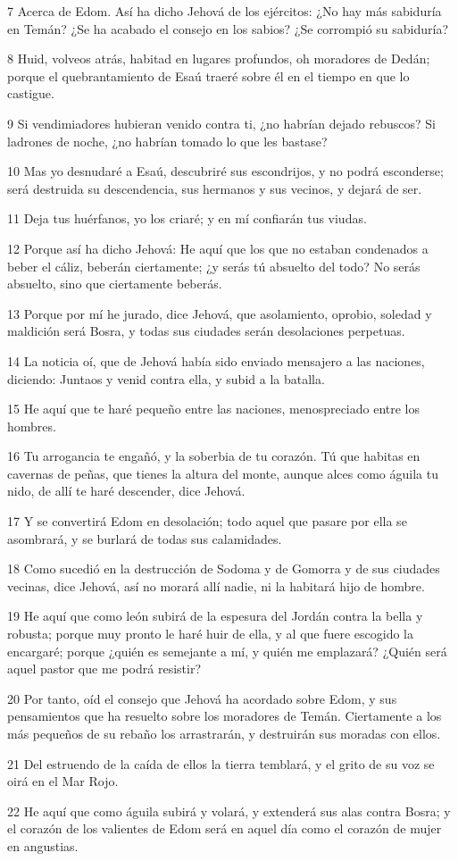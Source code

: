 \par 7 Acerca de Edom. Así ha dicho Jehová de los ejércitos: ¿No hay más sabiduría en Temán? ¿Se ha acabado el consejo en los sabios? ¿Se corrompió su sabiduría?
\par 8 Huid, volveos atrás, habitad en lugares profundos, oh moradores de Dedán; porque el quebrantamiento de Esaú traeré sobre él en el tiempo en que lo castigue.
\par 9 Si vendimiadores hubieran venido contra ti, ¿no habrían dejado rebuscos? Si ladrones de noche, ¿no habrían tomado lo que les bastase?
\par 10 Mas yo desnudaré a Esaú, descubriré sus escondrijos, y no podrá esconderse; será destruida su descendencia, sus hermanos y sus vecinos, y dejará de ser.
\par 11 Deja tus huérfanos, yo los criaré; y en mí confiarán tus viudas.
\par 12 Porque así ha dicho Jehová: He aquí que los que no estaban condenados a beber el cáliz, beberán ciertamente; ¿y serás tú absuelto del todo? No serás absuelto, sino que ciertamente beberás.
\par 13 Porque por mí he jurado, dice Jehová, que asolamiento, oprobio, soledad y maldición será Bosra, y todas sus ciudades serán desolaciones perpetuas.
\par 14 La noticia oí, que de Jehová había sido enviado mensajero a las naciones, diciendo: Juntaos y venid contra ella, y subid a la batalla.
\par 15 He aquí que te haré pequeño entre las naciones, menospreciado entre los hombres.
\par 16 Tu arrogancia te engañó, y la soberbia de tu corazón. Tú que habitas en cavernas de peñas, que tienes la altura del monte, aunque alces como águila tu nido, de allí te haré descender, dice Jehová.
\par 17 Y se convertirá Edom en desolación; todo aquel que pasare por ella se asombrará, y se burlará de todas sus calamidades.
\par 18 Como sucedió en la destrucción de Sodoma y de Gomorra y de sus ciudades vecinas, dice Jehová, así no morará allí nadie, ni la habitará hijo de hombre.
\par 19 He aquí que como león subirá de la espesura del Jordán contra la bella y robusta; porque muy pronto le haré huir de ella, y al que fuere escogido la encargaré; porque ¿quién es semejante a mí, y quién me emplazará? ¿Quién será aquel pastor que me podrá resistir?
\par 20 Por tanto, oíd el consejo que Jehová ha acordado sobre Edom, y sus pensamientos que ha resuelto sobre los moradores de Temán. Ciertamente a los más pequeños de su rebaño los arrastrarán, y destruirán sus moradas con ellos.
\par 21 Del estruendo de la caída de ellos la tierra temblará, y el grito de su voz se oirá en el Mar Rojo.
\par 22 He aquí que como águila subirá y volará, y extenderá sus alas contra Bosra; y el corazón de los valientes de Edom será en aquel día como el corazón de mujer en angustias. 

